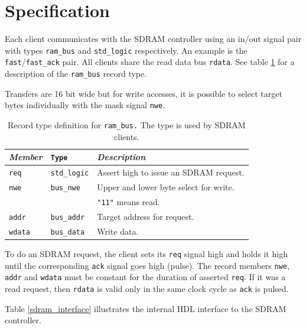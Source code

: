 \documentclass[a4paper]{report}
\begin{document}
\section{Specification}
Each client communicates with the SDRAM controller
using an in/out signal pair with types \texttt{ram\_bus}
and \texttt{std\_logic} respectively. An example is the
\texttt{fast}/\texttt{fast\_ack} pair. All clients share the
read data bus \texttt{rdata}. See table \ref{ram_bus_type}
for a description of the \texttt{ram\_bus} record type.

Transfers are 16 bit wide but for write accesses, it is
possible to select target bytes individually with the mask
signal \texttt{nwe}.

\begin{table}
\begin{tabular}{*3l}    \toprule
\emph{Member}   & \texttt{Type}         & \emph{Description} \\ \midrule
\texttt{req}    & \texttt{std\_logic}   & Assert high to issue an SDRAM request. \\
\texttt{nwe}    & \texttt{bus\_nwe}     & Upper and lower byte select for write.\\
                &                       & \texttt{"11"} means read. \\
\texttt{addr}   & \texttt{bus\_addr}    & Target address for request. \\
\texttt{wdata}  & \texttt{bus\_data}    & Write data. \\
\bottomrule
 \hline
\end{tabular}
\caption{Record type definition for \texttt{ram\_bus.} The type
is used by SDRAM clients.}
\label{ram_bus_type}
\end{table}

To do an SDRAM request, the client sets its \texttt{req} signal
high and holds it high until the corresponding \texttt{ack}
signal goes high (pulse). The record members \texttt{nwe},
\texttt{addr} and \texttt{wdata} must be constant for the
duration of asserted \texttt{req}.  If it was a read request,
then \texttt{rdata} is valid only in the same clock cycle as
\texttt{ack} is pulsed.

Table \ref{sdram_interface} illustrates the internal HDL
interface to the SDRAM controller.
\end{document}
